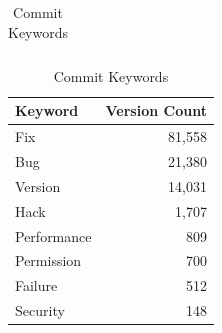 \documentclass[conference]{IEEEtran}
\begin{document}
\begin{table}
{{\begin{minipage}[b]{0.32\hsize}
\begin{center}
\begin{tabular}{ | l | r | }
         \end{tabular}
        \end{center}

    \end{minipage}
    \hfill
    \begin{minipage}[b]{0.32\hsize}\centering
       \caption{Commit Keywords}
        \label{table:KeywordCount}
       \begin{tabular}{ | l | r | }
              \hline
              \bfseries Keyword & \bfseries Version Count \\ \hline
              Fix & 81,558 \\ \hline
              Bug & 21,380 \\ \hline
              Version & 14,031 \\ \hline
              Hack & 1,707 \\ \hline
              Performance & 809 \\ \hline
              Permission & 700 \\ \hline
              Failure & 512  \\ \hline
              Security & 148 \\ \hline


            \end{tabular}

    \end{minipage}%
}}
\end{table}
\end{document}
